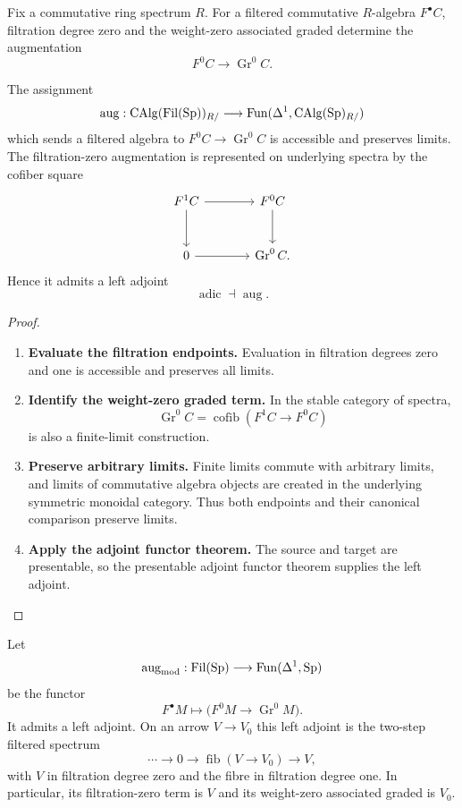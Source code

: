 Fix a commutative ring spectrum \(R\). For a filtered commutative \(R\)-algebra
\(F^\bullet C\), filtration degree zero and the weight-zero associated graded determine
the augmentation
\[
    F^0C\longrightarrow\operatorname{Gr}^0C.
\]

\begin{proposition}
\label{prop:filtered-augmentation-functor}
The assignment
\[
    \operatorname{aug}:
    \operatorname{CAlg}(\operatorname{Fil}(\operatorname{Sp}))_{R/}
    \longrightarrow
    \operatorname{Fun}(\Delta^1,\operatorname{CAlg}(\operatorname{Sp})_{R/})
\]
which sends a filtered algebra to
\(F^0C\to\operatorname{Gr}^0C\) is accessible and preserves limits. The filtration-zero augmentation is represented on underlying spectra by the
cofiber square
\[
\begin{tikzcd}[column sep=large,row sep=large]
    F^1C \arrow[r] \arrow[d]
        & F^0C \arrow[d]
    \\
    0 \arrow[r]
        & \operatorname{Gr}^0C .
\end{tikzcd}
\]
Hence it admits a left adjoint
\[
    \operatorname{adic}
    \dashv
    \operatorname{aug}.
\]
\end{proposition}

\begin{proof}
\leavevmode
\begin{enumerate}[label=\textup{(\arabic*)}]
    \item \textbf{Evaluate the filtration endpoints.}
    Evaluation in filtration degrees zero and one is accessible and preserves all
    limits.
    \item \textbf{Identify the weight-zero graded term.}
    In the stable category of spectra,
    \[
        \operatorname{Gr}^0C
        =
        \operatorname{cofib}(F^1C\to F^0C)
    \]
    is also a finite-limit construction.
    \item \textbf{Preserve arbitrary limits.}
    Finite limits commute with arbitrary
    limits, and limits of commutative algebra objects are created in the underlying
    symmetric monoidal category. Thus both endpoints and their canonical
    comparison preserve limits.
    \item \textbf{Apply the adjoint functor theorem.}
    The source and target are presentable, so the
    presentable adjoint functor theorem supplies the left adjoint.
\end{enumerate}
\end{proof}

\begin{lemma}
\label{lem:module-level-augmentation-filtration}
Let
\[
    \operatorname{aug}_{\mathrm{mod}}:
    \operatorname{Fil}(\operatorname{Sp})
    \longrightarrow
    \operatorname{Fun}(\Delta^1,\operatorname{Sp})
\]
be the functor
\[
    F^\bullet M\longmapsto
    \bigl(F^0M\longrightarrow\operatorname{Gr}^0M\bigr).
\]
It admits a left adjoint. On an arrow \(V\to V_0\) this left adjoint is the
two-step filtered spectrum
\[
    \cdots\longrightarrow0\longrightarrow
    \operatorname{fib}(V\to V_0)
    \longrightarrow V,
\]
with \(V\) in filtration degree zero and the fibre in filtration degree one. In particular,
its filtration-zero term is \(V\) and its weight-zero associated graded is
\(V_0\).
\end{lemma}

